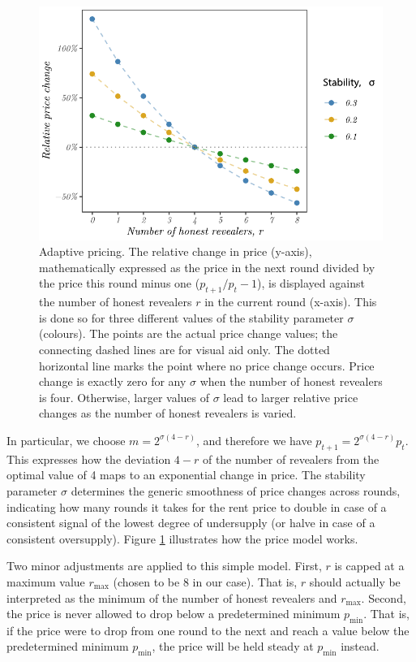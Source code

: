 \begin{figure}[!ht]
  \centering
  \includegraphics[width=.8\textwidth]{fig/adaptive-pricing.pdf}
  \caption[Adaptive pricing]{Adaptive pricing. The relative change in price (y-axis), mathematically expressed as the price in the next round divided by the price this round minus one ($p_{t+1} / p_t - 1$), is displayed against the number of honest revealers $r$ in the current round (x-axis). This is done so for three different values of the stability parameter $\sigma$ (colours). The points are the actual price change values; the connecting dashed lines are for visual aid only. The dotted horizontal line marks the point where no price change occurs. Price change is exactly zero for any $\sigma$ when the number of honest revealers is four. Otherwise, larger values of $\sigma$ lead to larger relative price changes as the number of honest revealers is varied.}
  \label{fig:adaptive-pricing}
\end{figure}

In particular, we choose $m = 2^{\sigma(4 - r)}$, and therefore we have $p_{t+1} = 2^{\sigma(4 - r)} p_t$. This expresses how the deviation $4 - r$ of the number of revealers from the optimal value of 4 maps to an exponential change in price. The stability parameter $\sigma$ determines the generic smoothness of price changes across rounds, indicating how many rounds it takes for the rent price to double in case of a consistent signal of the lowest degree of undersupply (or halve in case of a consistent oversupply). Figure \ref{fig:adaptive-pricing} illustrates how the price model works.

Two minor adjustments are applied to this simple model. First, $r$ is capped at a maximum value $r_{\text{max}}$ (chosen to be 8 in our case). That is, $r$ should actually be interpreted as the minimum of the number of honest revealers and $r_{\text{max}}$. Second, the price is never allowed to drop below a predetermined minimum $p_{\text{min}}$. That is, if the price were to drop from one round to the next and reach a value below the predetermined minimum $p_{\text{min}}$, the price will be held steady at $p_{\text{min}}$ instead. 

